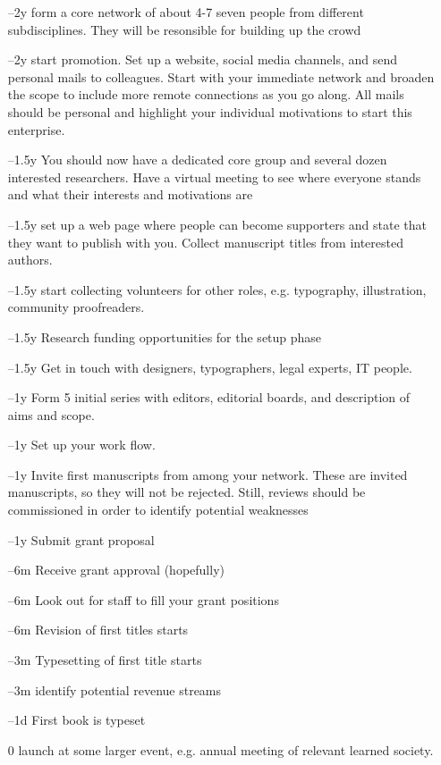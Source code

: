 \documentclass[nonflat,modfonts,output=book] {langsci/langscibook}
\begin{document}
\begin{itemize}
 \item[--2y] form a core network of about 4-7 seven people from different subdisciplines. They will be resonsible for building up the crowd 
 \item[--2y] start promotion. Set up a website, social media channels, and send personal mails to colleagues. Start with your immediate network and broaden the scope to include more remote connections as you go along. All mails should be personal and highlight your individual motivations to start this enterprise. 
 \item [--1.5y] You should now have a dedicated core group and several dozen interested researchers. Have a virtual meeting to see where everyone stands and what their interests and motivations are 
 \item[--1.5y] set up a web page where people can become supporters and state that they want to publish with you. Collect manuscript titles from interested authors. 
 \item[--1.5y] start collecting volunteers for other roles, e.g. typography, illustration, community proofreaders. 
 \item [--1.5y] Research funding opportunities for the setup phase 
 \item[--1.5y] Get in touch with designers, typographers, legal experts, IT people.
 \item[--1y] Form 5 initial series with editors, editorial boards, and description of aims and scope.
 \item[--1y] Set up your work flow.
 \item[--1y] Invite first manuscripts from among your network.  These are invited manuscripts, so they will not be rejected. Still, reviews should be commissioned in order to identify potential weaknesses
 \item[--1y] Submit grant proposal 
 \item[--6m] Receive grant approval (hopefully)
 \item[--6m] Look out for staff to fill your grant positions
 \item[--6m] Revision of first titles starts
 \item[--3m] Typesetting of first title starts
 \item[--3m] identify potential revenue streams
 \item[--1d] First book is typeset
 \item[0] launch at some larger event, e.g. annual meeting of relevant learned society. 

\end{itemize}
\end{document}
